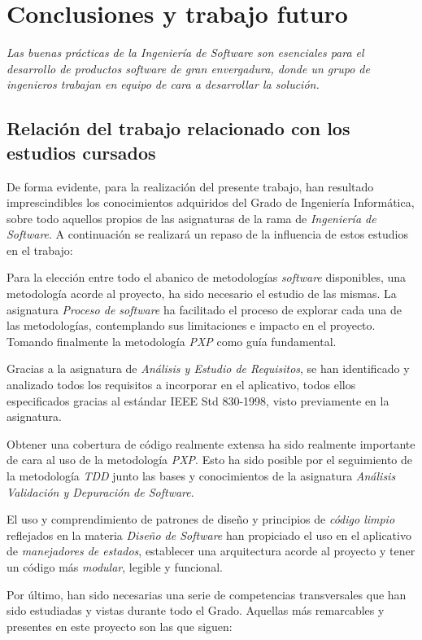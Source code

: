 \chapter{Conclusiones y trabajo futuro}
\textit{Las buenas prácticas de la Ingeniería de Software son esenciales para el desarrollo de
productos software de gran envergadura, donde un grupo de ingenieros trabajan en equipo de cara a desarrollar la solución. \cite{mall2018fundamentals}
}

\section{Relación del trabajo relacionado con los estudios cursados}
De forma evidente, para la realización del presente trabajo, han resultado imprescindibles los conocimientos adquiridos del
Grado de Ingeniería Informática, sobre todo aquellos propios de las asignaturas de la rama de \textit{Ingeniería de Software}.
A continuación se realizará un repaso de la influencia de estos estudios en el trabajo:

Para la elección entre todo el abanico de metodologías \textit{software} disponibles, una metodología acorde al proyecto, ha sido
necesario el estudio de las mismas. La asignatura \textit{Proceso de software} ha facilitado el proceso de explorar
cada una de las metodologías, contemplando sus limitaciones e impacto en el proyecto. Tomando finalmente la metodología \textit{PXP}
como guía fundamental.

Gracias  a la asignatura de \textit{Análisis y Estudio de Requisitos}, se han identificado y analizado todos
los requisitos a incorporar en el aplicativo, todos ellos especificados gracias al estándar IEEE Std 830-1998, visto previamente
en la asignatura.

Obtener una cobertura de código realmente extensa ha sido realmente importante de cara al uso de la
metodología \textit{PXP}. Esto ha sido posible por el seguimiento de la metodología \textit{TDD}
junto las bases y conocimientos de  la asignatura \textit{Análisis Validación y Depuración de Software}.

El uso y comprendimiento de patrones de diseño y principios de \textit{código limpio} reflejados en la materia \textit{Diseño de Software}
han propiciado el uso en el aplicativo de \textit{manejadores de estados}, establecer una arquitectura acorde
al proyecto y tener un código más \textit{modular}, legible y funcional.

Por último, han sido necesarias una serie de competencias transversales que han sido estudiadas
y vistas durante todo el Grado. Aquellas más remarcables y presentes en este proyecto son las que siguen:

